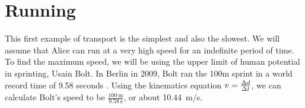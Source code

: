 \section{Running}
	This first example of transport is the simplest and also the slowest.
	We will assume that Alice can run at a very high speed for an indefinite period of time.
	To find the maximum speed, we will be using the upper limit of human potential in sprinting, Usain Bolt.
	In Berlin in 2009, Bolt ran the 100m sprint in a world record time of 9.58 seconds \autocite{boltRunning}.
	Using the kinematics equation $v = \frac{\mathrm{\Delta} d}{\mathrm{\Delta} t}$, we can calculate Bolt's speed to be $\frac{\SI{100}{\metre}}{\SI{9.58}{\second}}$, or about \SI{10.44}{\metre/\second}.
